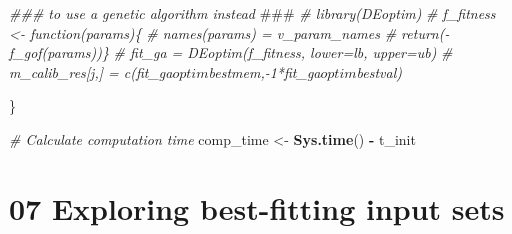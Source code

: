 \documentclass[
]{article}
\newenvironment{Shaded}{\begin{snugshade}}{\end{snugshade}}
\newcommand{\AlertTok}[1]{\textcolor[rgb]{0.94,0.16,0.16}{#1}}
\newcommand{\CommentTok}[1]{\textcolor[rgb]{0.56,0.35,0.01}{\textit{#1}}}
\newcommand{\KeywordTok}[1]{\textcolor[rgb]{0.13,0.29,0.53}{\textbf{#1}}}
\newcommand{\NormalTok}[1]{#1}
\newcommand{\OperatorTok}[1]{\textcolor[rgb]{0.81,0.36,0.00}{\textbf{#1}}}
\newcommand{\StringTok}[1]{\textcolor[rgb]{0.31,0.60,0.02}{#1}}
\begin{document}
\begin{Shaded}
\begin{Highlighting}[]
  \CommentTok{### to use a genetic algorithm instead }\AlertTok{###}
  \CommentTok{# library(DEoptim)}
  \CommentTok{# f_fitness <- function(params)\{}
  \CommentTok{#   names(params) = v_param_names}
  \CommentTok{#   return(-f_gof(params))\}}
  \CommentTok{# fit_ga = DEoptim(f_fitness, lower=lb, upper=ub)}
  \CommentTok{# m_calib_res[j,] = c(fit_ga$optim$bestmem,-1*fit_ga$optim$bestval)}

\NormalTok{  \}}

\CommentTok{# Calculate computation time}
\NormalTok{comp_time <-}\StringTok{ }\KeywordTok{Sys.time}\NormalTok{() }\OperatorTok{-}\StringTok{ }\NormalTok{t_init}
\end{Highlighting}
\end{Shaded}

\hypertarget{exploring-best-fitting-input-sets}{%
\section{07 Exploring best-fitting input
sets}\label{exploring-best-fitting-input-sets}}
\end{document}
